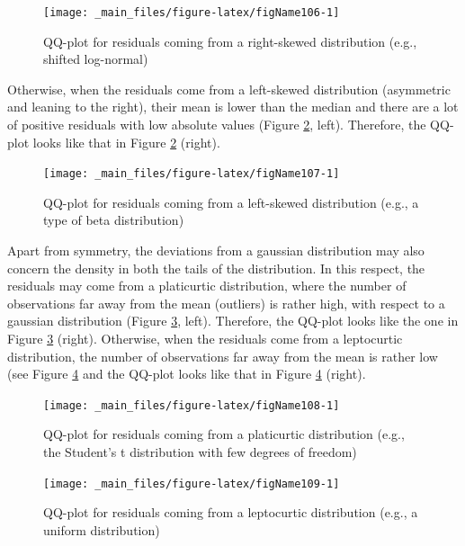 \documentclass[a4paper,12pt,oneside]{book}
\begin{document}
\begin{figure}

{\centering \texttt{[image: \_main\_files/figure-latex/figName106-1]} 

}

\caption{QQ-plot for residuals coming from a right-skewed distribution (e.g., shifted log-normal)}\label{fig:figName106}
\end{figure}

Otherwise, when the residuals come from a left-skewed distribution (asymmetric and leaning to the right), their mean is lower than the median and there are a lot of positive residuals with low absolute values (Figure \ref{fig:figName107}, left). Therefore, the QQ-plot looks like that in Figure \ref{fig:figName107} (right).

\begin{figure}

{\centering \texttt{[image: \_main\_files/figure-latex/figName107-1]} 

}

\caption{QQ-plot for residuals coming from a left-skewed distribution (e.g., a type of beta distribution)}\label{fig:figName107}
\end{figure}

Apart from symmetry, the deviations from a gaussian distribution may also concern the density in both the tails of the distribution. In this respect, the residuals may come from a platicurtic distribution, where the number of observations far away from the mean (outliers) is rather high, with respect to a gaussian distribution (Figure \ref{fig:figName108}, left). Therefore, the QQ-plot looks like the one in Figure \ref{fig:figName108} (right). Otherwise, when the residuals come from a leptocurtic distribution, the number of observations far away from the mean is rather low (see Figure \ref{fig:figName109} and the QQ-plot looks like that in Figure \ref{fig:figName109} (right).

\begin{figure}

{\centering \texttt{[image: \_main\_files/figure-latex/figName108-1]} 

}

\caption{QQ-plot for residuals coming from a platicurtic distribution (e.g., the Student's t distribution with few degrees of freedom)}\label{fig:figName108}
\end{figure}

\begin{figure}

{\centering \texttt{[image: \_main\_files/figure-latex/figName109-1]} 

}

\caption{QQ-plot for residuals coming from a leptocurtic distribution (e.g., a uniform distribution)}\label{fig:figName109}
\end{figure}
\end{document}
